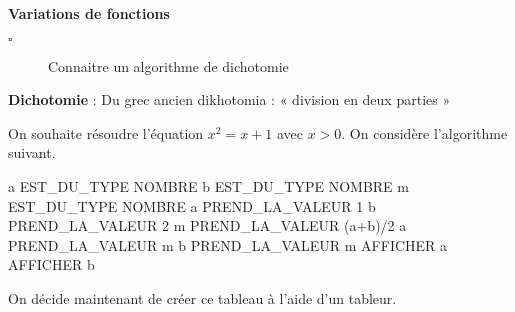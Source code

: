 \begin{titreTice}

\end{titreTice}


\begin{CpsCol}
\textbf{Variations de fonctions}
\begin{description}
\item[$\square$] Connaitre un algorithme de dichotomie
\end{description}
\end{CpsCol}

\begin{Ety}
\textbf{Dichotomie} : Du grec ancien dikhotomia : « division en deux parties »
\end{Ety}


On souhaite résoudre l'équation $x^2=x+1$ avec $x>0$. On considère l'algorithme suivant.


\begin{algobox}
\Variables
\Ligne a EST\_DU\_TYPE NOMBRE
\Ligne b EST\_DU\_TYPE NOMBRE
\Ligne m EST\_DU\_TYPE NOMBRE
\DebutAlgo
\Ligne a PREND\_LA\_VALEUR 1
\Ligne b PREND\_LA\_VALEUR 2
\DebutTantQue
\Ligne m PREND\_LA\_VALEUR (a+b)/2
\DebutSi
\Ligne a PREND\_LA\_VALEUR m
\FinSi
\Sinon
\DebutSinon
\Ligne b PREND\_LA\_VALEUR m
\FinSinon
\FinTantQue
\Ligne AFFICHER a
\Ligne AFFICHER b
\FinAlgo

\end{algobox}

On décide maintenant de créer ce tableau à l'aide d'un tableur.

